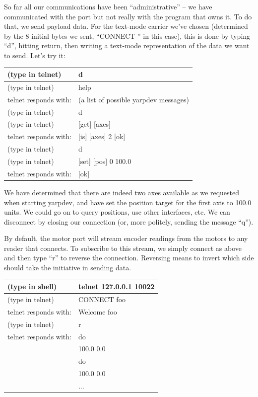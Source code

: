 So far all our communications have been ``administrative'' --
we have communicated with the port but not really with the 
program that owns it.  To do that, we send payload data.  For the
text-mode carrier we've chosen (determined by the 8 initial
bytes we sent, ``CONNECT '' in this case), this is done by typing
``d'', hitting return, then writing a text-mode representation of
the data we want to send.  Let's try it:

\begin{tabular}{|l|l|}
\hline
(type in telnet) & d \\
\hline
(type in telnet) & help \\
\hline
telnet responds with: & (a list of possible yarpdev messages)\\
\hline
(type in telnet) & d \\
\hline
(type in telnet) & [get] [axes] \\
\hline
telnet responds with: & [is] [axes] 2 [ok] \\
\hline
(type in telnet) & d \\
\hline
(type in telnet) & [set] [pos] 0 100.0 \\
\hline
telnet responds with: & [ok] \\
\hline

\end{tabular}

We have determined that there are indeed two axes available as we requested
when starting yarpdev, and have set the position target for the
first axis to 100.0 units.  We could go on to query positions, use
other interfaces, etc.  We can disconnect by closing our connection
(or, more politely, sending the message ``q'').

By default, the motor port will stream encoder readings from the motors
to any reader that connects.  To subscribe to this stream, we simply
connect as above and then type ``r'' to reverse the connection.
Reversing means to invert which side should take the initiative
in sending data.


\begin{tabular}{|l|l|}
\hline
(type in shell) & telnet 127.0.0.1 10022 \\
\hline
(type in telnet) & CONNECT foo \\
\hline
telnet responds with: & Welcome foo \\
\hline
(type in telnet) & r \\
\hline
telnet responds with: & do \\
\hline
 & 100.0 0.0 \\
\hline
 & do \\
\hline
 & 100.0 0.0 \\
\hline
 & ... \\
\hline
\end{tabular}

